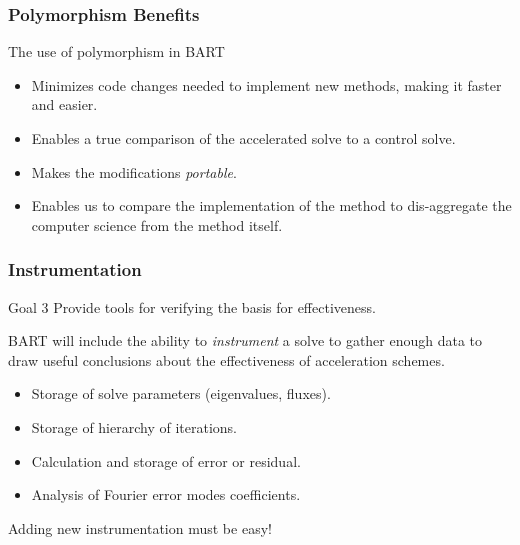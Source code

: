 \documentclass[xcolor=x11names, compress]{beamer}
\begin{document}
\begin{frame}
  \frametitle{Polymorphism Benefits}
  The use of polymorphism in BART
  \begin{itemize}
  \item<1-> Minimizes code changes needed to implement new methods,
    making it faster and easier.
  \item<2-> Enables a true comparison of the accelerated solve to a
    control solve.
  \item<3-> Makes the modifications \textit{portable}.    
  \item<4-> Enables us to compare the implementation of the method to
    dis-aggregate the computer science from the method itself.
  \end{itemize}
 
\end{frame}
\begin{frame}
  \frametitle{Instrumentation}
  \pause
  \begin{block}{Goal 3}
    Provide tools for verifying the basis for effectiveness.
  \end{block}
  \pause
  BART will include the ability to \textit{instrument} a solve
  to gather enough data to draw useful conclusions about the effectiveness of
  acceleration schemes.
\begin{itemize}
  \item Storage of solve parameters (eigenvalues, fluxes).
  \item Storage of hierarchy of iterations.
  \item Calculation and storage of error or residual.
  \item Analysis of Fourier error modes coefficients.
  \end{itemize}

\pause
  \begin{block}{}
    Adding new instrumentation must be easy!
  \end{block}
\end{frame}
\end{document}
